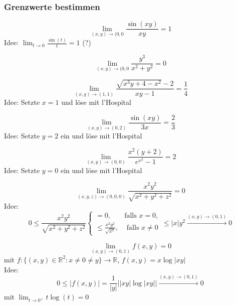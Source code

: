 \subsubsection{Grenzwerte bestimmen}
\begin{displaymath}
  \lim_{(x,y) \to (0,0} \frac{\sin(xy)}{xy} = 1
\end{displaymath}
Idee: $\lim_{t \to 0} \frac{\sin(t)}{t} = 1$ (?)

\begin{displaymath}
  \lim_{(x,y) \to (0,0} \frac{y^3}{x^2 + y^2} = 0
\end{displaymath}

\begin{displaymath}
  \lim_{(x,y) \to (1,1)} \frac{\sqrt{x^3y + 4 - x^2} - 2}{xy - 1} = \frac{1}{4}
\end{displaymath}
Idee: Setzte $x = 1$ und löse mit l'Hospital

\begin{displaymath}
  \lim_{(x,y) \to (0,2)} \frac{\sin(xy)}{3x} = \frac{2}{3}
\end{displaymath}
Idee: Setzte $y = 2$ ein und löse mit l'Hospital

\begin{displaymath}
  \lim_{(x,y) \to (0,0)} \frac{x^2(y + 2)}{e^{x^2} - 1} = 2
\end{displaymath}
Idee: Setzte $y = 0$ ein und löse mit l'Hospital

\begin{displaymath}
  \lim_{(x,y,z) \to (0,0,0)} \frac{x^2 y^2}{\sqrt{x^2 + y^2 + z^2}} = 0
\end{displaymath}
Idee:
\begin{displaymath}
  0 \leq \frac{x^2 y^2}{\sqrt{x^2 + y^2 + z^2}}
  \begin{cases}
    = 0,& \text{falls } x = 0,\\
    \leq \frac{x^2 y^2}{\sqrt{x^2}},& \text{ falls } x \neq 0
  \end{cases}
  \leq |x|y^2 \xrightarrow{(x,y) \to (0,1)} 0
\end{displaymath}

\begin{displaymath}
  \lim_{(x,y) \to (0,1)} f(x,y) = 0
\end{displaymath}
mit $f : \{(x,y) \in \mathbb{R}^2: x \neq 0 \neq y\} \to \mathbb{R}$, $f(x,y) = x \log |xy|$\\
Idee:
\begin{displaymath}
  0 \leq |f(x,y)| = \frac{1}{|y|} ||xy| \log |xy|| \xrightarrow{(x,y) \to (0,1)} 0
\end{displaymath}
mit $\lim_{t \to 0^+} t\log(t) = 0$

